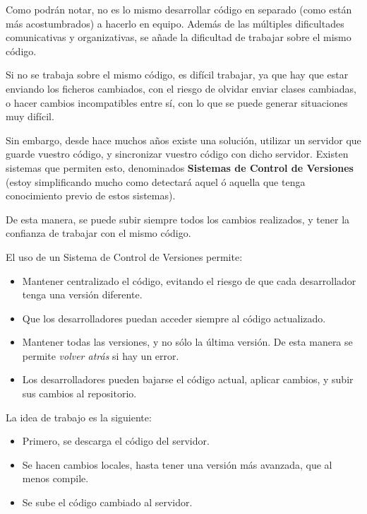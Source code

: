 \documentclass[11pt]{article}
\begin{document}
Como podrán notar, no es lo mismo desarrollar código en separado (como están más acostumbrados) a hacerlo en equipo. 
Además de las múltiples dificultades comunicativas y organizativas, se añade la dificultad de trabajar sobre el mismo
código. 


Si no se trabaja sobre el mismo código, es difícil trabajar, ya que hay que estar enviando los ficheros cambiados, con
el riesgo de olvidar enviar clases cambiadas, o hacer cambios incompatibles entre sí, con lo que se puede generar
situaciones muy difícil. 


Sin embargo, desde hace muchos años existe una solución, utilizar un servidor que guarde vuestro código, y sincronizar
vuestro código con dicho servidor. Existen sistemas que permiten esto, denominados \textbf{Sistemas de Control de Versiones}
(estoy simplificando mucho como detectará aquel ó aquella que tenga conocimiento previo de estos sistemas). 


De esta manera, se puede subir siempre todos los cambios realizados, y tener la confianza de trabajar con el mismo 
código. 


El uso de un Sistema de Control de Versiones permite: 




\begin{itemize}
\item Mantener centralizado el código, evitando el riesgo de que cada desarrollador tenga una versión diferente.
\item Que los desarrolladores puedan acceder siempre al código actualizado.
\item Mantener todas las versiones, y no sólo la última versión. De esta manera se permite \emph{volver atrás} si hay un
  error.
\item Los desarrolladores pueden bajarse el código actual, aplicar cambios, y subir sus cambios al repositorio.
\end{itemize}


La idea de trabajo es la siguiente:




\begin{itemize}
\item Primero, se descarga el código del servidor.
\item Se hacen cambios locales, hasta tener una versión más avanzada, que al menos compile.
\item Se sube el código cambiado al servidor.
\end{itemize}
\end{document}
